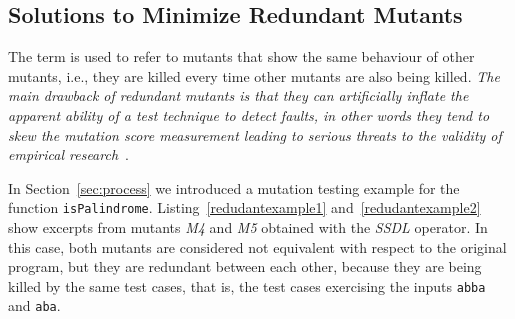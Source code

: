 
\subsection{Solutions to Minimize Redundant Mutants}
\label{sec:opt:redundant}

The term  is used to refer to mutants that show the same behaviour of other mutants, i.e., they
are killed every time other mutants are also being killed. 
\emph{The main drawback of redundant mutants is that they can artificially inflate the apparent ability of a test technique to detect faults, in other words they tend to skew the mutation score measurement leading to serious threats to the validity of empirical research}~\cite{papadakis2016threats}.




In Section~\ref{sec:process} we introduced a mutation testing example for the function \texttt{isPalindrome}. 
Listing~\ref{redudantexample1} and~\ref{redudantexample2} show excerpts from mutants \textit{M4} and \textit{M5} obtained with the \textit{SSDL} operator. In this case, both mutants are considered not equivalent with respect to the original program, but they are redundant between each other, because they are being killed by the same test cases, that is, the test cases exercising the inputs \texttt{abba} and \texttt{aba}.


